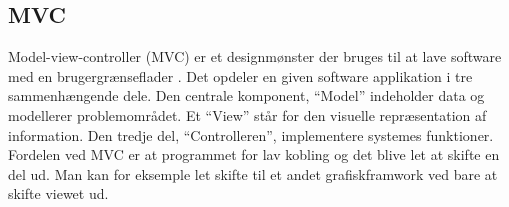 \subsection{MVC}
Model-view-controller (MVC) er et designmønster der bruges til at lave software med en brugergrænseflader \cite{mvcLecture}. Det opdeler en given software applikation i tre sammenhængende dele. Den centrale komponent, \enquote{Model} indeholder data og modellerer problemområdet. Et \enquote{View} står for den visuelle repræsentation af information. Den tredje del, \enquote{Controlleren}, implementere systemes funktioner. Fordelen ved MVC er at programmet for lav kobling og det blive let at skifte en del ud. Man kan for eksemple let skifte til et andet grafiskframwork ved bare at skifte viewet ud.


